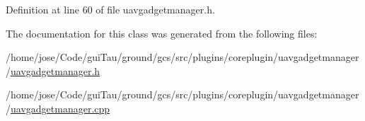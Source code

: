 Definition at line 60 of file uavgadgetmanager.\-h.



The documentation for this class was generated from the following files\-:\begin{DoxyCompactItemize}
\item 
/home/jose/\-Code/gui\-Tau/ground/gcs/src/plugins/coreplugin/uavgadgetmanager/\hyperlink{uavgadgetmanager_8h}{uavgadgetmanager.\-h}\item 
/home/jose/\-Code/gui\-Tau/ground/gcs/src/plugins/coreplugin/uavgadgetmanager/\hyperlink{uavgadgetmanager_8cpp}{uavgadgetmanager.\-cpp}\end{DoxyCompactItemize}
